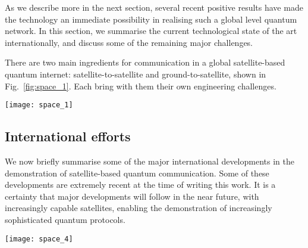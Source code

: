 As we describe more in the next section, several recent positive results have made the technology an immediate possibility in realising such a global level quantum network. In this section, we summarise the current technological state of the art internationally, and discuss some of the remaining major challenges.  

There are two main ingredients for communication in a global satellite-based quantum internet: satellite-to-satellite and ground-to-satellite, shown in Fig.~\ref{fig:space_1}. Each bring with them their own engineering challenges.

\begin{figure*}[!htb]
\texttt{[image: space\_1]}
\caption{Various possibilities for space-based quantum communication. (a) Satellite-to-satellite quantum communication \cite{bib:byrnes2017lorentz}. (b) Ground-to-satellite quantum communication \cite{bib:armengol08}. }
\label{fig:space_1}
\end{figure*}

%
%


\subsection{International efforts}

We now briefly summarise some of the major international developments in the demonstration of satellite-based quantum communication. Some of these developments are extremely recent at the time of writing this work. It is a certainty that major developments will follow in the near future, with increasingly capable satellites, enabling the demonstration of increasingly sophisticated quantum protocols.

\begin{figure*}[!htb]
\texttt{[image: space\_4]}
\caption{The Chinese Micius quantum communications satellite. (a) Schematic of the satellite and ground stations used to observe the entangled photons \cite{bib:popkin17}. . (b) Attenuation during entanglement distribution from \cite{bib:yin2017satellite}. (c) Fidelities achieved for teleportation of various states as marked from \cite{bib:ren2017ground}.}
\label{fig:space_4}
\end{figure*}


